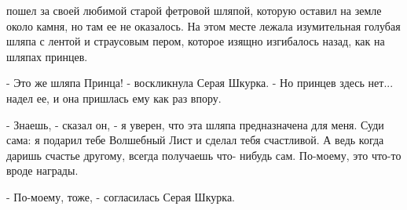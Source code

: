  пошел за своей любимой старой фетровой шляпой, которую 
оставил на земле около камня, но там ее не оказалось. На этом месте 
лежала изумительная голубая шляпа с лентой и страусовым пером, которое 
изящно изгибалось назад, как на шляпах принцев.
\par- Это же шляпа Принца! - воскликнула Серая Шкурка. - Но принцев 
здесь нет...
 надел ее, и она пришлась ему как раз впору.
\par- Знаешь, - сказал он, - я уверен, что эта шляпа предназначена для 
меня. Суди сама: я подарил тебе Волшебный Лист и сделал тебя 
счастливой. А ведь когда даришь счастье другому, всегда получаешь что-
нибудь сам. По-моему, это что-то вроде награды.
\par- По-моему, тоже, - согласилась Серая Шкурка.
